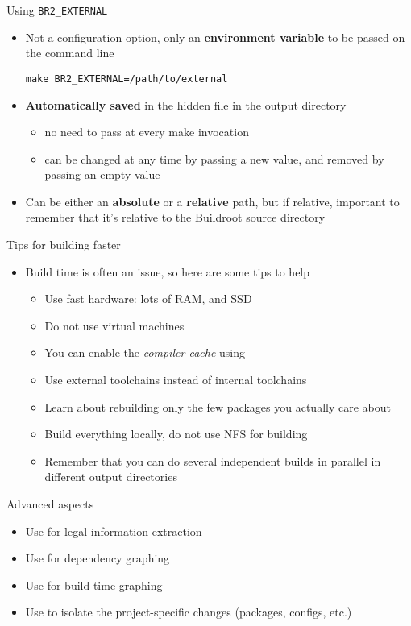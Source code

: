 \begin{frame}[fragile]{Using {\tt BR2\_EXTERNAL}}
  \begin{itemize}
  \item Not a configuration option, only an {\bf environment variable}
    to be passed on the command line
    \begin{block}{}
\begin{verbatim}
make BR2_EXTERNAL=/path/to/external
\end{verbatim}
    \end{block}
  \item {\bf Automatically saved} in the hidden 
    file in the output directory
    \begin{itemize}
    \item no need to pass  at every make invocation
    \item can be changed at any time by passing a new value, and
      removed by passing an empty value
    \end{itemize}
  \item Can be either an {\bf absolute} or a {\bf relative} path, but
    if relative, important to remember that it's relative to the
    Buildroot source directory
  \end{itemize}
\end{frame}

\begin{frame}{Tips for building faster}
  \begin{itemize}
  \item Build time is often an issue, so here are some tips to help
    \begin{itemize}
    \item Use fast hardware: lots of RAM, and SSD
    \item Do not use virtual machines
    \item You can enable the  {\em compiler cache} using
    \item Use external toolchains instead of internal toolchains
    \item Learn about rebuilding only the few packages you actually
      care about
    \item Build everything locally, do not use NFS for building
    \item Remember that you can do several independent builds in
      parallel in different output directories
    \end{itemize}
  \end{itemize}
\end{frame}

\setuplabframe
{Advanced aspects}
{
  \begin{itemize}
  \item Use  for legal information extraction
  \item Use  for dependency graphing
  \item Use  for build time graphing
  \item Use  to isolate the project-specific
    changes (packages, configs, etc.)
  \end{itemize}
}
